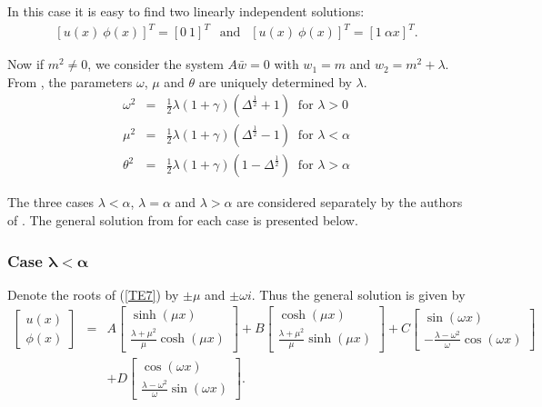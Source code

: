 \documentclass[../../main.tex]{subfiles}
\begin{document}
In  this case it is easy to find two linearly independent solutions:
\begin{eqnarray*}
\left[u(x) \ \phi(x)\right]^{T} = \left[0 \ 1 \right]^{T} \ \ \textrm{ and } \ \ \left[u(x) \ \phi(x)\right]^{T} = \left[1 \ \alpha x \right]^{T}.
\end{eqnarray*}



Now if $m^{2} \neq 0$, we consider the system $A\bar{w}=0$ with $w_{1} = m$ and $w_{2} = m^{2} + \lambda$. From \cite{VV06}, the parameters $\omega$, $\mu$ and $\theta$ are uniquely determined by $\lambda$.
\begin{eqnarray}
	\omega^2 & = & \frac{1}{2}\lambda(1+\gamma)(\Delta^{\frac{1}{2}}+1) \ \textrm{ for } \lambda >0\\
	\mu^2 & = & \frac{1}{2}\lambda(1+\gamma)(\Delta^{\frac{1}{2}}-1) \ \textrm{ for } \lambda < \alpha\\
	\theta^2 & = & \frac{1}{2}\lambda(1+\gamma)(1-\Delta^{\frac{1}{2}}) \ \textrm{ for } \lambda > \alpha
\end{eqnarray}

 The three cases $\lambda < \alpha$, $\lambda = \alpha$ and $\lambda > \alpha$ are considered separately by the authors of \cite{VV06}. The general solution from \cite{VV06} for each case is presented below.

\subsubsection{Case $\boldsymbol{\lambda<\alpha}$}

Denote the roots of (\ref{TE7}) by $\pm \mu$ and $\pm \omega i$. Thus the general solution is given by
\begin{eqnarray*}
\begin{bmatrix}
u(x)\\ \phi(x)
\end{bmatrix}
&=&
A
\begin{bmatrix}
\sinh (\mu x) \\ \frac{\lambda+\mu^{2}}{\mu}\cosh (\mu x)
\end{bmatrix}
+
B
\begin{bmatrix}
\cosh (\mu x) \\ \frac{\lambda+\mu^{2}}{\mu}\sinh (\mu x)
\end{bmatrix}
+
C
\begin{bmatrix}
\sin (\omega x) \\ -\frac{\lambda-\omega^{2}}{\omega}\cos (\omega x)
\end{bmatrix}\\
&&
+
D
\begin{bmatrix}
\cos (\omega x) \\ \frac{\lambda-\omega^{2}}{\omega}\sin (\omega x)
\end{bmatrix}.
\end{eqnarray*}
\end{document}
